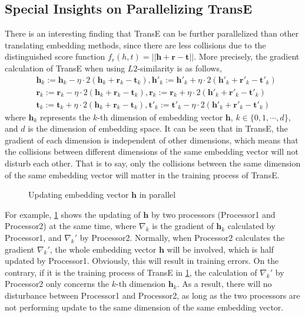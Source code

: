 \documentclass[sigconf]{acmart}
\begin{document}
\subsection{Special Insights on Parallelizing TransE}
There is an interesting finding that TransE can be further parallelized than other translating embedding methods, since there are less collisions due to the distinguished score function $f_r(h,t)=||\mathbf{h}+\mathbf{r}-\mathbf{t}||$. More precisely, the gradient calculation of TransE when using $L2$-similarity is as follows, 
\begin{align}
\label{eqtransegrad}
& \mathbf{h}_k := \mathbf{h}_k-\eta \cdot 2(\mathbf{h}_k+\mathbf{r}_k-\mathbf{t}_k), \mathbf{h'}_k := \mathbf{h'}_k+\eta \cdot 2(\mathbf{h'}_k+\mathbf{r'}_k-\mathbf{t'}_k) \nonumber\\
&  \mathbf{r}_k := \mathbf{r}_k-\eta \cdot 2(\mathbf{h}_k+\mathbf{r}_k-\mathbf{t}_k) , \mathbf{r}_k := \mathbf{r}_k+\eta \cdot 2(\mathbf{h'}_k+\mathbf{r'}_k-\mathbf{t'}_k) \nonumber\\
&  \mathbf{t}_k := \mathbf{t}_k+\eta \cdot 2(\mathbf{h}_k+\mathbf{r}_k-\mathbf{t}_k) , \mathbf{t'}_k := \mathbf{t'}_k-\eta \cdot 2(\mathbf{h'}_k+\mathbf{r'}_k-\mathbf{t'}_k) 
\end{align}
where $ \mathbf{h}_k $ represents the $k$-th dimension of embedding vector $\mathbf{h}$, $k \in \{0,1,\cdots,d\}$, and $d$ is the dimension of embedding space. It can be seen that in TransE, the gradient of each dimension is independent of other dimensions, which means that the collisions between different dimensions of the same embedding vector will not disturb each other. That is to say, only the collisions between the  same dimension of the same embedding vector will matter in the training process of TransE.

\begin{figure}[htbp]
\centering
{}
\vspace{-7pt}
\caption{Updating embedding vector $\mathbf{h}$ in parallel}
\label{multithread2}
\vspace{-7pt}
\end{figure}

For example, \figurename \ref{multithread2} shows the updating of $\mathbf{h}$ by two processors (Processor1 and Processor2) at the same time, where $\nabla_k$ is the gradient of $ \mathbf{h}_k$ calculated by Processor1, and $\nabla_k'$ by Processor2.
Normally, when Processor2 calculates the gradient $\nabla_k'$, the whole embedding vector $ \mathbf{h}$ will be involved, which  is half updated by Processor1. Obviously, this will result in training errors.   
On the contrary, if it is the training process of TransE in \figurename \ref{multithread2}, the calculation of $\nabla_k'$ by Processor2 only concerns the $k$-th dimension $\mathbf{h}_k$. As a result, there will no disturbance between Processor1 and Processor2, as long as the two processors are not performing update to the same dimension of the same embedding vector.
\end{document}
